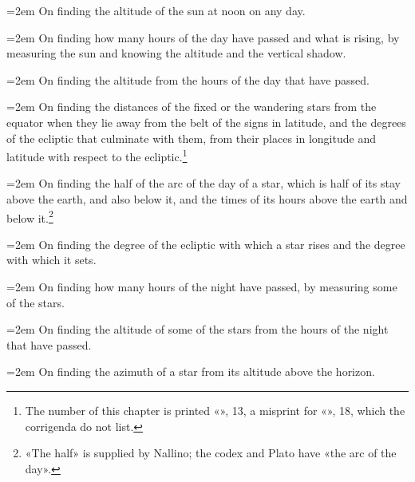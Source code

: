\documentclass[11pt]{article}
\newcommand{\ArPage}[1]{\marginpar{\footnotesize\color{gray}Ar.\,p.\,#1}}
\begin{document}
\par\noindent\hangindent=2em On finding the altitude of the sun at noon on any day.\par
\par\noindent\hangindent=2em On finding how many hours of the day have passed and what is rising, by measuring the sun and knowing the altitude and the vertical shadow.\par
\par\noindent\hangindent=2em On finding the altitude from the hours of the day that have passed.\par
\par\noindent\hangindent=2em \ArPage{3}On finding the distances of the fixed or the wandering stars from the equator when they lie away from the belt of the signs in latitude, and the degrees of the ecliptic that culminate with them, from their places in longitude and latitude with respect to the ecliptic.\footnote{The number of this chapter is printed «», 13, a misprint for «», 18, which the corrigenda do not list.}\par
\par\noindent\hangindent=2em On finding the half of the arc of the day of a star, which is half of its stay above the earth, and also below it, and the times of its hours above the earth and below it.\footnote{«The half» is supplied by Nallino; the codex and Plato have «the arc of the day».}\par
\par\noindent\hangindent=2em On finding the degree of the ecliptic with which a star rises and the degree with which it sets.\par
\par\noindent\hangindent=2em On finding how many hours of the night have passed, by measuring some of the stars.\par
\par\noindent\hangindent=2em On finding the altitude of some of the stars from the hours of the night that have passed.\par
\par\noindent\hangindent=2em On finding the azimuth of a star from its altitude above the horizon.\par
\end{document}
